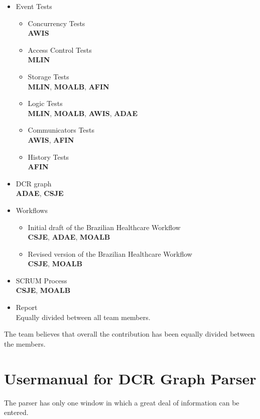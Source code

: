 \begin{itemize}
	\item Event Tests
	\begin{itemize}
		\item Concurrency Tests\\
		\textbf{AWIS}
		\item Access Control Tests\\
		\textbf{MLIN}
		\item Storage Tests\\
		\textbf{MLIN}, \textbf{MOALB}, \textbf{AFIN}
		\item Logic Tests\\
		\textbf{MLIN}, \textbf{MOALB}, \textbf{AWIS}, \textbf{ADAE}
		\item Communicators Tests\\
		\textbf{AWIS}, \textbf{AFIN}
		\item History Tests\\
		\textbf{AFIN}
	\end{itemize}
	\item DCR graph\\
	\textbf{ADAE}, \textbf{CSJE}
	\item Workflows
	\begin{itemize}
		\item Initial draft of the Brazilian Healthcare Workflow\\
		\textbf{CSJE}, \textbf{ADAE}, \textbf{MOALB}
		\item Revised version of the Brazilian Healthcare Workflow\\
		\textbf{CSJE}, \textbf{MOALB}
	\end{itemize}
	\item SCRUM Process\\
	\textbf{CSJE}, \textbf{MOALB}
	\item Report\\
	Equally divided between all team members.
\end{itemize}

The team believes that overall the contribution has been equally divided between the members.



\section{Usermanual for DCR Graph Parser \label{sec:UsermanualForDcrGraphParser}}
The parser has only one window in which a great deal of information can be entered.\\

